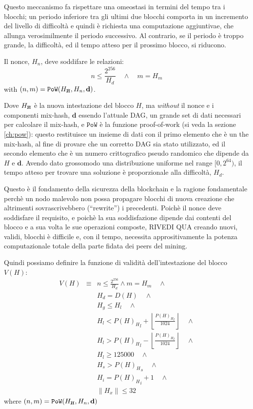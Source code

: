 \documentclass[9pt,oneside]{amsart}
\newcommand{\hcancel}[1]{%
    \tikz[baseline=(tocancel.base)]{
        \node[inner sep=0pt,outer sep=0pt] (tocancel) {#1};
        \draw[black] (tocancel.south west) -- (tocancel.north east);
    }%
}%
\begin{document}
\begin{multicols}{2}
Questo meccanismo fa rispettare una omeostasi in termini del tempo tra i blocchi; un periodo inferiore tra gli ultimi due blocchi comporta in un incremento del livello di difficoltà e quindi è richiesta una computazione aggiuntivae, che allunga verosimilmente il periodo successivo. Al contrario, se il periodo è troppo grande, la difficoltà, ed il tempo atteso per il prossimo blocco, si riducono.

Il nonce, $H_n$, deve soddifare le relazioni:
\begin{equation}
n \leqslant \frac{2^{256}}{H_d} \quad \wedge \quad m = H_m
\end{equation}
with $(n, m) = \mathtt{PoW}(H_{\hcancel{n}}, H_n, \mathbf{d})$.

Dove $H_{\hcancel{n}}$ è la nuova intestazione del blocco $H$, ma \textit{without} il nonce e i componenti mix-hash, $\mathbf{d}$ essendo l'attuale DAG, un grande set di dati necessari per calcolare il mix-hash, e $\mathtt{PoW}$ è la funzione proof-of-work (si veda la sezione \ref{ch:pow}): questo restituisce un insieme di dati con il primo elemento che è un the mix-hash, al fine di provare che un corretto DAG sia stato utilizzato, ed il secondo elemento che è un numero crittografico pseudo randomico che dipende da $H$ e $\mathbf{d}$. Avendo dato grossomodo una distribuzione uniforme nel range $[0, 2^{64})$, il tempo atteso per trovare una soluzione è proporzionale alla difficoltà, $H_d$.

Questo è il fondamento della sicurezza della blockchain e la ragione fondamentale perchè un nodo malevolo non possa propagare blocchi di nuova creazione che altrimenti sovrascrivebbero (``rewrite'') i precedenti. Poichè il nonce deve soddisfare il requisito, e poichè la sua soddisfazione dipende dai contenti del blocco e a sua volta le sue operazioni composte, RIVEDI QUA creando nuovi, validi, blocchi è difficile e, con il tempo, necessita apprositivamente la potenza computazionale totale della parte fidata dei peers del mining.

Quindi possiamo definire la funzione di validità dell'intestazione del blocco $V(H)$:
\begin{eqnarray}
V(H) & \equiv &  n \leqslant \frac{2^{256}}{H_d} \wedge m = H_m \quad \wedge \\
& & H_d = D(H) \quad \wedge \\
& & H_g \le H_l  \quad \wedge \\
& & H_l < {P(H)_H}_l + \left\lfloor\frac{{P(H)_H}_l}{1024}\right\rfloor  \quad \wedge \\
& & H_l > {P(H)_H}_l - \left\lfloor\frac{{P(H)_H}_l}{1024}\right\rfloor  \quad \wedge \\
& & H_l \geqslant 125000  \quad \wedge \\
& & H_s > {P(H)_H}_s \quad \wedge \\
& & H_i = {P(H)_H}_i +1 \quad \wedge \\
& & \lVert H_x \rVert \le 32
\end{eqnarray}
where $(n, m) = \mathtt{PoW}(H_{\hcancel{n}}, H_n, \mathbf{d})$


\end{multicols}
\end{document}
